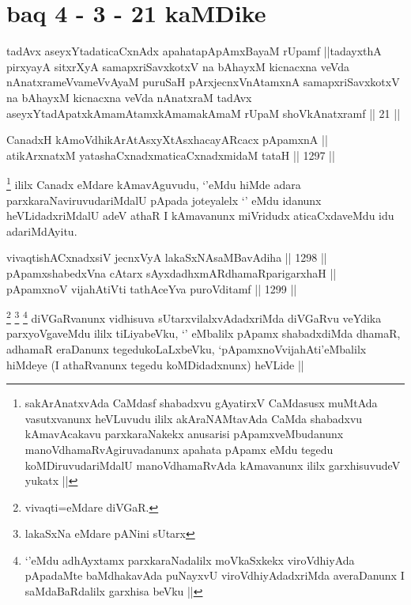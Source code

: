 
\section*{baq 4 - 3 - 21 kaMDike}

\begin{shl}
tadAvx aseyxYtadaticaCxnAdx apahatapApAmxBayaM rUpamf ||tadayxthA pirxyayA sitxrXyA samapxriSavxkotxV na bAhayxM kicnacxna veVda nAnatxrameVvameVvAyaM puruSaH pArxjecnxVnAtamxnA samapxriSavxkotxV na bAhayxM kicnacxna veVda nAnatxraM tadAvx aseyxYtadApatxkAmamAtamxkAmamakAmaM rUpaM shoVkAnatxramf || 21 ||
\end{shl}


\begin{shl}
CanadxH kAmoV\s dhikArAtAsxyXtAsxhacayARcacx pApamxnA || \\
atikArxnatxM yatashaCxnadxmaticaCxnadxmidaM tataH ||  1297 ||  
\end{shl}

\begin{artha}
\footnote{sakArAnatxvAda CaMdasf shabadxvu gAyatirxV CaMdasusx muMtAda vasutxvanunx heVLuvudu ililx akAraNAMtavAda CaMda shabadxvu kAmavAcakavu parxkaraNakekx anusarisi pApamxveMbudanunx manoVdhamaRvAgiruvadanunx apahata pApamx eMdu tegedu koMDiruvudariMdalU manoVdhamaRvAda kAmavanunx ililx garxhisuvudeV yukatx ||}
ililx Canadx eMdare kAmavAguvudu, `\stext'eMdu hiMde adara parxkaraNaviruvudariMdalU pApada joteyalelx `\stext' eMdu idanunx heVLidadxriMdalU adeV athaR I kAmavanunx miVridudx aticaCxdaveMdu idu adariMdAyitu.
\end{artha}


\begin{shl}
vivaqtishACxnadxsiV jecnxVyA lakaSxNAsaMBavAdiha ||  1298 ||  \\
pApamxshabedxVna cAtarx sAyxdadhxmARdhamaRparigarxhaH ||  \\
pApamxnoV vijahAtiVti tathAceYva puroVditamf ||  1299 ||  
\end{shl}

\begin{artha}
\footnote{vivaqti=eMdare diVGaR.}
\footnote{lakaSxNa eMdare pANini sUtarx}
\footnote{`\stext'eMdu adhAyxtamx parxkaraNadalilx moVkaSxkekx viroVdhiyAda pApadaMte baMdhakavAda puNayxvU viroVdhiyAdadxriMda averaDanunx I saMdaBaRdalilx garxhisa beVku ||}
diVGaRvanunx vidhisuva sUtarxvilalxvAdadxriMda diVGaRvu veYdika parxyoVgaveMdu ililx tiLiyabeVku, `\stext' eMbalilx pApamx shabadxdiMda dhamaR, adhamaR eraDanunx tegedukoLaLxbeVku, `pApamxnoVvija{hA}ti'eMbalilx hiMdeye (I athaRvanunx tegedu koMDidadxnunx) heVLide ||
\end{artha}

